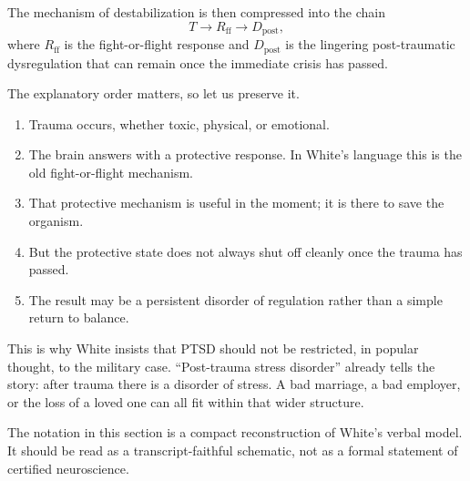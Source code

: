 The mechanism of destabilization is then compressed into the chain
\begin{equation}
T \to R_{\mathrm{ff}} \to D_{\mathrm{post}},
\end{equation}
where \(R_{\mathrm{ff}}\) is the fight-or-flight response and \(D_{\mathrm{post}}\) is the lingering post-traumatic dysregulation that can remain once the immediate crisis has passed.

The explanatory order matters, so let us preserve it.
\begin{enumerate}
\item Trauma occurs, whether toxic, physical, or emotional.
\item The brain answers with a protective response. In White's language this is the old fight-or-flight mechanism.
\item That protective mechanism is useful in the moment; it is there to save the organism.
\item But the protective state does not always shut off cleanly once the trauma has passed.
\item The result may be a persistent disorder of regulation rather than a simple return to balance.
\end{enumerate}

This is why White insists that PTSD should not be restricted, in popular thought, to the military case. ``Post-trauma stress disorder'' already tells the story: after trauma there is a disorder of stress. A bad marriage, a bad employer, or the loss of a loved one can all fit within that wider structure.

\begin{remark}
The notation in this section is a compact reconstruction of White's verbal model. It should be read as a transcript-faithful schematic, not as a formal statement of certified neuroscience.
\end{remark}

